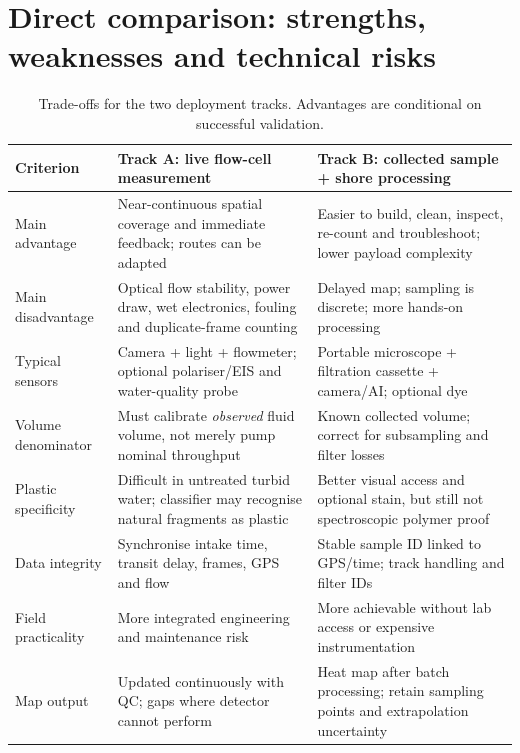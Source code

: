 \documentclass[10pt,a4paper]{article}
\begin{document}
\section{Direct comparison: strengths, weaknesses and technical risks}
\begin{table}[H]\centering\footnotesize
\caption{Trade-offs for the two deployment tracks. Advantages are conditional on successful validation.}\label{tab:proscons}
\begin{tabularx}{\linewidth}{@{}L{2.4cm}YY@{}}\toprule
{}\textbf{Criterion} & \textbf{Track A: live flow-cell measurement} & \textbf{Track B: collected sample + shore processing} \\\midrule
Main advantage & Near-continuous spatial coverage and immediate feedback; routes can be adapted & Easier to build, clean, inspect, re-count and troubleshoot; lower payload complexity \\
Main disadvantage & Optical flow stability, power draw, wet electronics, fouling and duplicate-frame counting & Delayed map; sampling is discrete; more hands-on processing \\
Typical sensors & Camera + light + flowmeter; optional polariser/EIS and water-quality probe & Portable microscope + filtration cassette + camera/AI; optional dye \\
Volume denominator & Must calibrate \emph{observed} fluid volume, not merely pump nominal throughput & Known collected volume; correct for subsampling and filter losses \\
Plastic specificity & Difficult in untreated turbid water; classifier may recognise natural fragments as plastic & Better visual access and optional stain, but still not spectroscopic polymer proof \\
Data integrity & Synchronise intake time, transit delay, frames, GPS and flow & Stable sample ID linked to GPS/time; track handling and filter IDs \\
Field practicality & More integrated engineering and maintenance risk & More achievable without lab access or expensive instrumentation \\
Map output & Updated continuously with QC; gaps where detector cannot perform & Heat map after batch processing; retain sampling points and extrapolation uncertainty \\
\bottomrule\end{tabularx}
\end{table}
\end{document}
